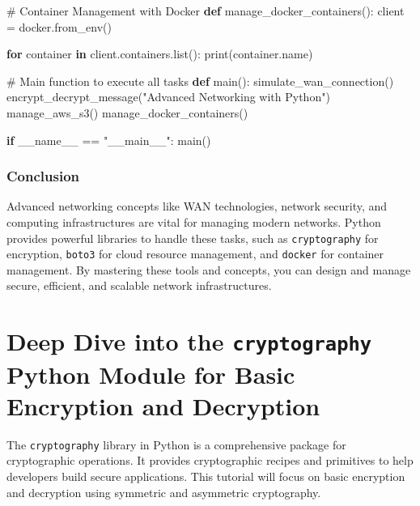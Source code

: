 \documentclass[
  letterpaper,
  DIV=11,
  numbers=noendperiod]{scrreprt}
\newenvironment{Shaded}{\begin{snugshade}}{\end{snugshade}}
\newcommand{\BuiltInTok}[1]{\textcolor[rgb]{0.00,0.23,0.31}{#1}}
\newcommand{\CommentTok}[1]{\textcolor[rgb]{0.37,0.37,0.37}{#1}}
\newcommand{\ControlFlowTok}[1]{\textcolor[rgb]{0.00,0.23,0.31}{\textbf{#1}}}
\newcommand{\KeywordTok}[1]{\textcolor[rgb]{0.00,0.23,0.31}{\textbf{#1}}}
\newcommand{\NormalTok}[1]{\textcolor[rgb]{0.00,0.23,0.31}{#1}}
\newcommand{\OperatorTok}[1]{\textcolor[rgb]{0.37,0.37,0.37}{#1}}
\newcommand{\StringTok}[1]{\textcolor[rgb]{0.13,0.47,0.30}{#1}}
\newcommand{\VariableTok}[1]{\textcolor[rgb]{0.07,0.07,0.07}{#1}}
\begin{document}
\begin{Shaded}
\begin{Highlighting}[]
\CommentTok{\# Container Management with Docker}
\KeywordTok{def}\NormalTok{ manage\_docker\_containers():}
\NormalTok{    client }\OperatorTok{=}\NormalTok{ docker.from\_env()}
    
    \ControlFlowTok{for}\NormalTok{ container }\KeywordTok{in}\NormalTok{ client.containers.}\BuiltInTok{list}\NormalTok{():}
        \BuiltInTok{print}\NormalTok{(container.name)}

\CommentTok{\# Main function to execute all tasks}
\KeywordTok{def}\NormalTok{ main():}
\NormalTok{    simulate\_wan\_connection()}
\NormalTok{    encrypt\_decrypt\_message(}\StringTok{"Advanced Networking with Python"}\NormalTok{)}
\NormalTok{    manage\_aws\_s3()}
\NormalTok{    manage\_docker\_containers()}

\ControlFlowTok{if} \VariableTok{\_\_name\_\_} \OperatorTok{==} \StringTok{"\_\_main\_\_"}\NormalTok{:}
\NormalTok{    main()}
\end{Highlighting}
\end{Shaded}

\subsection{Conclusion}\label{conclusion-48}

Advanced networking concepts like WAN technologies, network security,
and computing infrastructures are vital for managing modern networks.
Python provides powerful libraries to handle these tasks, such as
\texttt{cryptography} for encryption, \texttt{boto3} for cloud resource
management, and \texttt{docker} for container management. By mastering
these tools and concepts, you can design and manage secure, efficient,
and scalable network infrastructures.


\chapter{\texorpdfstring{Deep Dive into the \texttt{cryptography} Python
Module for Basic Encryption and
Decryption}{Deep Dive into the cryptography Python Module for Basic Encryption and Decryption}}\label{deep-dive-into-the-cryptography-python-module-for-basic-encryption-and-decryption}

The \texttt{cryptography} library in Python is a comprehensive package
for cryptographic operations. It provides cryptographic recipes and
primitives to help developers build secure applications. This tutorial
will focus on basic encryption and decryption using symmetric and
asymmetric cryptography.
\end{document}
